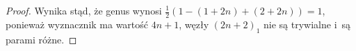 \begin{proof}

    Wynika stąd, że genus wynosi $\frac 12 (1 - (1+2n) + (2+2n)) = 1$, ponieważ wyznacznik ma wartość $4n+1$,
    węzły $(2n+2)_1$ nie są trywialne i~są parami różne.
\end{proof}

